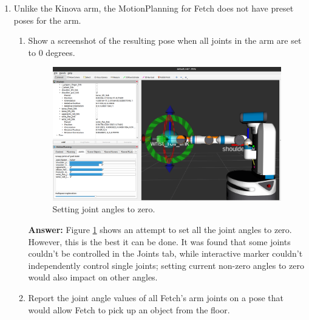 \documentclass[12pt]{article}
\begin{document}
\begin{enumerate}
    \textit{$\text{base\_link} \rightarrow \text{torso\_lift\_link} \rightarrow \text{shoulder\_pan\_link} \rightarrow \text{shoulder\_lift\_link} \rightarrow \text{upperarm\_roll\_link} \rightarrow \text{elbow\_flex\_link} \rightarrow \text{forearm\_roll\_link} \rightarrow \text{wrist\_flex\_link} \rightarrow \text{wrist\_roll\_link} \rightarrow \text{gripper\_link}$}
    
    \item Unlike the Kinova arm, the MotionPlanning for Fetch does not have preset poses for the arm.
    
    \begin{enumerate}

        \item Show a screenshot of the resulting pose when all joints in the arm are set to 0 degrees.
        
        \begin{figure}[h]
            \centering\includegraphics[width=14cm]{images/fetch_zero.png}
            \caption{Setting joint angles to zero.}\label{fig:fetch_zero}\vspace{-4pt}
        \end{figure}

        \textbf{Answer: }Figure \ref{fig:fetch_zero} shows an attempt to set all the joint angles to zero. However, this is the best it can be done. It was found that some joints couldn't be controlled in the Joints tab, while interactive marker couldn't independently control single joints; setting current non-zero angles to zero would also impact on other angles.
        
        \item Report the joint angle values of all Fetch’s arm joints on a pose that would allow Fetch to pick up an object from the floor.
        

\end{enumerate}
\end{enumerate}
\end{document}
